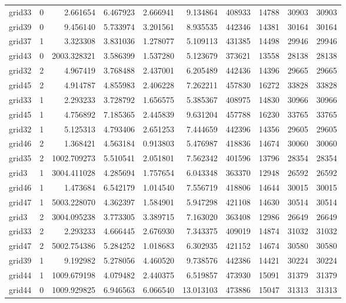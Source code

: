 \begin{longtable}{|l|r|r|r|r|r|r|r|r|r|}
grid33 & 0 & 2.661654 & 6.467923 & 2.666941 & 9.134864 & 408933 & 14788 & 30903 & 30903 \\
grid39 & 0 & 9.456140 & 5.733974 & 3.201561 & 8.935535 & 442346 & 14381 & 30164 & 30164 \\
grid37 & 1 & 3.323308 & 3.831036 & 1.278077 & 5.109113 & 431385 & 14498 & 29946 & 29946 \\
grid43 & 0 & 2003.328321 & 3.586399 & 1.537280 & 5.123679 & 373621 & 13558 & 28138 & 28138 \\
grid32 & 2 & 4.967419 & 3.768488 & 2.437001 & 6.205489 & 442436 & 14396 & 29665 & 29665 \\
grid45 & 2 & 4.914787 & 4.855983 & 2.406228 & 7.262211 & 457830 & 16272 & 33828 & 33828 \\
grid33 & 1 & 2.293233 & 3.728792 & 1.656575 & 5.385367 & 408975 & 14830 & 30966 & 30966 \\
grid45 & 1 & 4.756892 & 7.185365 & 2.445839 & 9.631204 & 457788 & 16230 & 33765 & 33765 \\
grid32 & 1 & 5.125313 & 4.793406 & 2.651253 & 7.444659 & 442396 & 14356 & 29605 & 29605 \\
grid46 & 2 & 1.368421 & 4.563184 & 0.913803 & 5.476987 & 418836 & 14674 & 30060 & 30060 \\
grid35 & 2 & 1002.709273 & 5.510541 & 2.051801 & 7.562342 & 401596 & 13796 & 28354 & 28354 \\
grid3 & 1 & 3004.411028 & 4.285694 & 1.757654 & 6.043348 & 363370 & 12948 & 26592 & 26592 \\
grid46 & 1 & 1.473684 & 6.542179 & 1.014540 & 7.556719 & 418806 & 14644 & 30015 & 30015 \\
grid47 & 1 & 5003.228070 & 4.362397 & 1.584901 & 5.947298 & 421108 & 14630 & 30514 & 30514 \\
grid3 & 2 & 3004.095238 & 3.773305 & 3.389715 & 7.163020 & 363408 & 12986 & 26649 & 26649 \\
grid33 & 2 & 2.293233 & 4.666445 & 2.676930 & 7.343375 & 409019 & 14874 & 31032 & 31032 \\
grid47 & 2 & 5002.754386 & 5.284252 & 1.018683 & 6.302935 & 421152 & 14674 & 30580 & 30580 \\
grid39 & 1 & 9.192982 & 5.278056 & 4.460520 & 9.738576 & 442386 & 14421 & 30224 & 30224 \\
grid44 & 1 & 1009.679198 & 4.079482 & 2.440375 & 6.519857 & 473930 & 15091 & 31379 & 31379 \\
grid44 & 0 & 1009.929825 & 6.946563 & 6.066540 & 13.013103 & 473886 & 15047 & 31313 & 31313 \\

\end{longtable}
